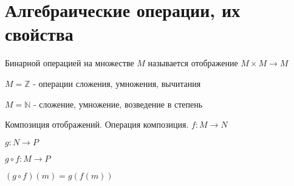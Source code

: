 
\section{Алгебраические операции, их свойства}
\begin{conj}
    Бинарной операцией на множестве $M$ называется отображение $M\times M \to M$
\end{conj}

$M=\mathbb{Z}$ - операции сложения, умножения, вычитания

$M=\mathbb{N}$ - сложение, умножение, возведение в степень

\begin{conj}
Композиция отображений. Операция композиция. $f: M \to N$

$g: N\to P$

$g\circ f: M \to P$

$(g\circ f)(m) = g(f(m))$
\end{conj}

